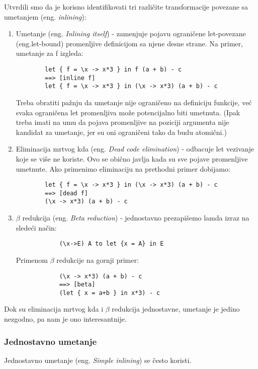 Utvrdili smo da je korisno identifikovati tri različite transformacije povezane sa umetanjem (eng. \emph{inlining}):
\begin{enumerate}
	\item  Umetanje (eng.\emph{ Inlining itself}) - zamenjuje pojavu ograničene let-povezane (eng.let-bound) promenljive definicijom sa njene desne strane. Na primer, umetanje za f izgleda: 
	\begin{verbatim}
		let { f = \x -> x*3 } in f (a + b) - c
		==> [inline f]
		let { f = \x -> x*3 } in (\x -> x*3) (a + b) - c
	\end{verbatim}
	Treba obratiti pažnju da umetanje nije ograničeno na definiciju funkcije, već svaka ograničena let promenljiva može potencijalno biti umetnuta. (Ipak treba imati na umu da pojava promenljive na poziciji argumenta nije kandidat za umetanje, jer su oni ograničeni tako da budu atomični.)
	\item Eliminacija mrtvog kda (eng. \emph{Dead code elimination}) - odbacuje let vezivanje koje se više ne koriste. Ovo se obično javlja 
	kada su sve pojave promenljive umetnute. Ako primenimo eliminaciju na prethodni primer dobijamo:
	\begin{verbatim}
		let { f = \x -> x*3 } in (\x -> x*3) (a + b) - c
		==> [dead f]
		(\x -> x*3) (a + b) - c
	\end{verbatim}
	\item $\beta$  redukcija (eng. \emph{Beta reduction}) - jednostavno prezapišemo lamda izraz na sledeći način:
		\begin{verbatim}
			(\x->E) A to let {x = A} in E 
		\end{verbatim} Primenom $\beta$ redukcije na gornji primer:
		\begin{verbatim}
			(\x -> x*3) (a + b) - c
			==> [beta]
			(let { x = a+b } in x*3) - c
		\end{verbatim}
\end{enumerate}

Dok su eliminacija mrtvog kda i $\beta$ redukcija jednostavne, umetanje je jedino nezgodno, pa nam je ono interesantnije.

\subsubsection{Jednostavno umetanje}
\label{sec:podpodnaslovSimpleInline}

Jednostavno umetanje (eng. \emph{Simple inlining}) se često koristi. 

